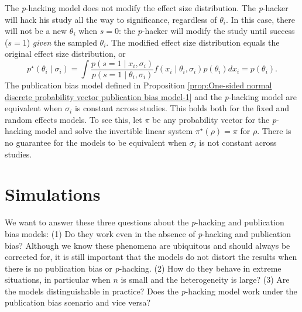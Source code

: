 \documentclass[useAMS,usenatbib,referee]{biom}
\begin{document}
The \textit{p}-hacking model does not modify the effect size distribution. The \textit{p}-hacker will hack his study all the way to significance, regardless of $\theta_i$. In this case, there will not be a new $\theta_i$ when $s=0$: the $p$-hacker will modify the study until success ($s=1$) \emph{given} the sampled $\theta_i$. The modified effect size distribution equals the original effect size distribution, or
\[
p^\star(\theta_i\mid \sigma_i)=\int\frac{p(s=1\mid x_i, \sigma_i)}{p(s=1\mid \theta_i, \sigma_i)}f(x_i \mid \theta_i, \sigma _i) p(\theta_i)dx_i = p(\theta_i).
\]
The publication bias model defined in Proposition \ref{prop:One-sided normal discrete probability vector publication bias model-1} and the \textit{p}-hacking model are equivalent when $\sigma_{i}$ is constant across studies. This holds both for the fixed and random effects models. To see this, let $\pi$ be any probability vector for the \textit{p}-hacking model and solve the invertible linear system $\pi^{\star}(\rho)=\pi$ for $\rho$. There is no guarantee for the models to be equivalent when $\sigma_{i}$ is not constant across studies. 
\section{Simulations}\label{sect:simulations}

We want to answer these three questions about the \textit{p}-hacking and publication bias models: (1) Do they work even in the absence of \textit{p}-hacking and publication bias? Although we know these phenomena are ubiquitous and should always be corrected for, it is still important that the models do not distort the results when there is no publication bias or \textit{p}-hacking. (2) How do they behave in extreme situations, in particular when $n$ is small and the heterogeneity is large? (3) Are the models distinguishable in practice? Does the \textit{p}-hacking model work under the publication bias scenario and vice versa?
\end{document}
